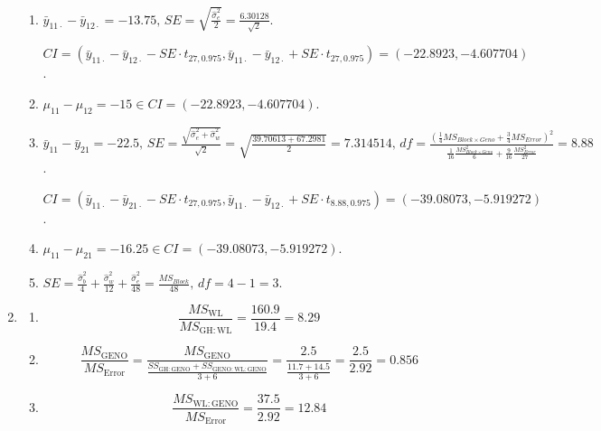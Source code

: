 \documentclass{article}
\begin{document}
\begin{enumerate}[leftmargin = 0 em, label = \arabic*., font = \bfseries]
\begin{enumerate}
		\item 
		$\bar{y}_{11 \cdot} - \bar{y}_{12 \cdot} = -13.75,\, SE = \sqrt{\frac{\hat{\sigma}_{e}^2}{2}} = \frac{6.30128}{\sqrt{2}}$. 

		$CI = (\bar{y}_{11 \cdot} - \bar{y}_{12 \cdot} - SE \cdot t_{27, 0.975} ,\bar{y}_{11 \cdot} - \bar{y}_{12 \cdot} + SE \cdot t_{27, 0.975} ) = ( -22.8923, -4.607704)$. 
		\item 
		$\mu_{11} - \mu_{12} = -15 \in CI = (-22.8923, -4.607704)$.

		\item 
		$\bar{y}_{11} - \bar{y}_{21} = -22.5,\, SE = \frac{\sqrt{\hat{\sigma}_e^2 + \hat{\sigma}_w^2}}{\sqrt{2}} = \sqrt{\frac{39.70613 + 67.2981}{2}} =  7.314514,\, df = \frac{\left( \frac{1}{4} MS_{Block \times Geno} + \frac{3}{4} MS_{Error} \right)^2 }{\frac{1}{16} \frac{MS_{Block \times Geno}^2}{6} + \frac{9}{16} \frac{MS_{Error}^2}{27}} = 8.88$. 

		$CI = (\bar{y}_{11 \cdot} - \bar{y}_{21 \cdot} - SE \cdot t_{27, 0.975} ,\bar{y}_{11 \cdot} - \bar{y}_{12 \cdot} + SE \cdot t_{8.88, 0.975} ) = ( -39.08073, -5.919272)$.

		\item 
		$\mu_{11} - \mu_{21} = -16.25 \in CI = ( -39.08073, -5.919272)$.

		\item 
		$SE = \frac{\hat{\sigma}_b^2}{4}+\frac{\hat{\sigma}_w^2}{12} + \frac{\hat{\sigma}_e^2}{48} = \frac{MS_{Block}}{48},\, df = 4-1 = 3$. 
	\end{enumerate}
	

	\item 
	\begin{enumerate}
		\item 
		\[\frac{MS_{\mathrm{WL}}}{MS_{\mathrm{GH:WL}}} = \frac{160.9}{19.4} = 8.29\]

		\item 
		\[\frac{MS_{\mathrm{GENO}}}{MS_{\mathrm{Error}}} = \frac{MS_{\mathrm{GENO}}}{\frac{SS_{\mathrm{GH:GENO}} + SS_{\mathrm{GENO : WL : GENO}}} {3+6}} = \frac{2.5}{\frac{11.7 + 14.5}{3+6}} = \frac{2.5}{2.92} = 0.856\]

		\item
		\[\frac{MS_{\mathrm{WL:GENO}}}{MS_{\mathrm{Error}}} = \frac{37.5}{2.92} = 12.84\] 
	\end{enumerate}


\end{enumerate}
\end{document}
